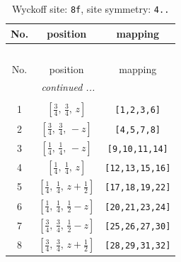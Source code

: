 \documentclass[fleqn,8pt]{jsarticle}
\begin{document}
\begin{longtable}{ccc}
\caption{Wyckoff site: {\tt 8f}, site symmetry: {\tt 4..}}
 \\
 \hline \hline
No. & position & mapping \\ \hline \endfirsthead

\multicolumn{2}{l}{\tablename\ \thetable{}} \\
 \hline \hline
No. & position & mapping \\ \hline \endhead

 \hline \hline
\multicolumn{2}{r}{\footnotesize\it continued ...} \\ \endfoot

 \hline \hline
\multicolumn{2}{r}{} \\ \endlastfoot

1 & $\left[ \frac{3}{4},\, \frac{3}{4},\, z \right]$ & {\tt [1,2,3,6]} \\ \hline
2 & $\left[ \frac{3}{4},\, \frac{3}{4},\, - z \right]$ & {\tt [4,5,7,8]} \\ \hline
3 & $\left[ \frac{1}{4},\, \frac{1}{4},\, - z \right]$ & {\tt [9,10,11,14]} \\ \hline
4 & $\left[ \frac{1}{4},\, \frac{1}{4},\, z \right]$ & {\tt [12,13,15,16]} \\ \hline
5 & $\left[ \frac{1}{4},\, \frac{1}{4},\, z + \frac{1}{2} \right]$ & {\tt [17,18,19,22]} \\ \hline
6 & $\left[ \frac{1}{4},\, \frac{1}{4},\, \frac{1}{2} - z \right]$ & {\tt [20,21,23,24]} \\ \hline
7 & $\left[ \frac{3}{4},\, \frac{3}{4},\, \frac{1}{2} - z \right]$ & {\tt [25,26,27,30]} \\ \hline
8 & $\left[ \frac{3}{4},\, \frac{3}{4},\, z + \frac{1}{2} \right]$ & {\tt [28,29,31,32]} \\
\end{longtable}
\renewcommand{\arraystretch}{1.2}
\end{document}
